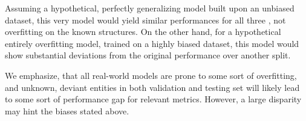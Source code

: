 \documentclass{bioinfo}
\begin{document}
Assuming a hypothetical, perfectly generalizing model built upon an
unbiased dataset, this very model would yield similar performances for
all three , not overfitting on the known
structures. On the other hand, for a hypothetical entirely overfitting
model, trained on a highly biased dataset, this model would show
substantial deviations from the original performance over another
split.

We emphasize, that all real-world models are prone to some sort of
overfitting, and unknown, deviant entities in both validation and
testing set will likely lead to some sort of performance gap for
relevant metrics. However, a large disparity may hint the biases
stated above.




\end{document}
